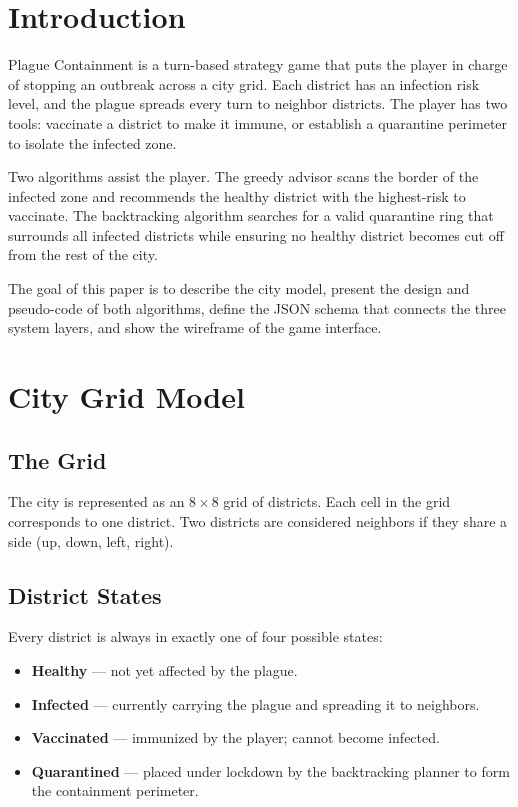 \documentclass[conference]{IEEEtran}
\begin{document}
\section{Introduction}

Plague Containment is a turn-based strategy game that puts the player in charge
of stopping an outbreak across a city grid. Each district has an infection risk
level, and the plague spreads every turn to neighbor districts. The player has
two tools: vaccinate a district to make it immune, or establish a quarantine
perimeter to isolate the infected zone.

Two algorithms assist the player. The greedy advisor scans the border of the
infected zone and recommends the healthy district with the highest-risk to
vaccinate. The backtracking algorithm searches for a valid quarantine ring that
surrounds all infected districts while ensuring no healthy district becomes cut
off from the rest of the city.

The goal of this paper is to describe the city model, present the design and
pseudo-code of both algorithms, define the JSON schema that connects the three
system layers, and show the wireframe of the game interface.

\section{City Grid Model}

\subsection{The Grid}

The city is represented as an $8\times8$ grid of districts. Each cell in the
grid corresponds to one district. Two districts are considered neighbors if they
share a side (up, down, left, right).

\subsection{District States}

Every district is always in exactly one of four possible states:

\begin{itemize}
  \item \textbf{Healthy} — not yet affected by the plague.
  \item \textbf{Infected} — currently carrying the plague and
        spreading it to neighbors.
  \item \textbf{Vaccinated} — immunized by the player; cannot
        become infected.
  \item \textbf{Quarantined} — placed under lockdown by the
        backtracking planner to form the containment perimeter.
\end{itemize}
\end{document}
